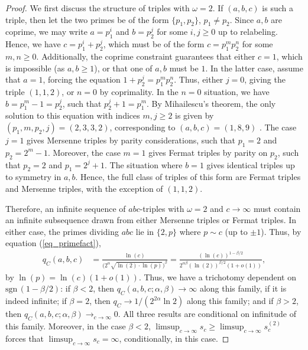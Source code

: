 \documentclass[11pt,letterpaper]{amsart}
\def\ra{\rightarrow}
\def\sgn{\mathrm{sgn \, }}
\begin{document}
\begin{proof}
We first discuss the structure of triples with $\omega = 2$. If $(a, b, c)$ is such a triple, then let the two primes be of the form $\{p_1,p_2\}$, $p_1 \neq p_2$. Since $a,b$ are coprime, we may write $a=p_1^i$ and $b=p_2^j$ for some $i,j\ge 0$ up to relabeling. Hence, we have $c=p_1^i+p_2^j$, which must be of the form $c=p_1^m p_2^n$ for some $m,n\ge 0$. Additionally, the coprime constraint guarantees that either $c = 1$, which is impossible (as $a, b \ge 1$), or that one of $a, b$ must be $1$. In the latter case, assume that $a = 1$, forcing the equation $1 + p_2^j = p_1^m p_2^n$. Thus, either $j = 0$, giving the triple $(1, 1, 2)$, or $n = 0$ by coprimality. In the $n = 0$ situation, we have $b=p_1^m-1=p_2^j$, such that $p_2^j+1=p_1^m$. By Mihailescu's theorem, the only solution to this equation with indices $m,j\ge 2$ is given by $(p_1, m, p_2, j) = (2, 3, 3, 2)$, corresponding to $(a, b, c) = (1, 8, 9)$ \cite{mihailescu2004primary}. The case $j = 1$ gives Mersenne triples by parity considerations, such that $p_1 = 2$ and $p_2 = 2^m - 1$. Moreover, the case $m = 1$ gives Fermat triples by parity on $p_2$, such that $p_2 = 2$ and $p_1 = 2^j + 1$. The situation where $b = 1$ gives identical triples up to symmetry in $a, b$. Hence, the full class of triples of this form are Fermat triples and Mersenne triples, with the exception of $(1, 1, 2)$.

Therefore, an infinite sequence of $abc$-triples with $\omega = 2$ and $c \ra \infty$ must contain an infinite subsequence drawn from either Mersenne triples or Fermat triples. In either case, the primes dividing $abc$ lie in $\{2,p\}$ where $p \sim c$ (up to $\pm 1$). Thus, by equation (\ref{eq_primefact}),
\begin{align*}
q_C (a, b, c) &= \frac{\ln(c)}{\bigl(2^\alpha\sqrt{\ln (2)\cdot\ln (p)}\bigr)^\beta} =  \frac{(\ln (c))^{1-\beta/2}}{2^{\alpha\beta}(\ln (2))^{\beta/2} (1+o(1))},
\end{align*}
by $\ln(p)=\ln(c)(1 + o(1))$. Thus, we have a trichotomy dependent on $\sgn(1 - \beta/2)$: if $\beta < 2$, then $q_C(a, b, c; \alpha, \beta) \ra \infty$ along this family, if it is indeed infinite; if $\beta = 2$, then $q_C \ra 1/(2^{2\alpha}\ln 2)$ along this family; and if $\beta > 2$, then $q_C(a, b, c; \alpha, \beta) \ra_{c \ra \infty} 0$. All three results are conditional on infinitude of this family. Moreover, in the case $\beta < 2$, $\limsup_{c \ra \infty} s_c \ge \limsup_{c \ra \infty} s_c^{(2)}$ forces that $\limsup_{c \ra \infty} s_c = \infty$, conditionally, in this case.
\end{proof}
\end{document}
